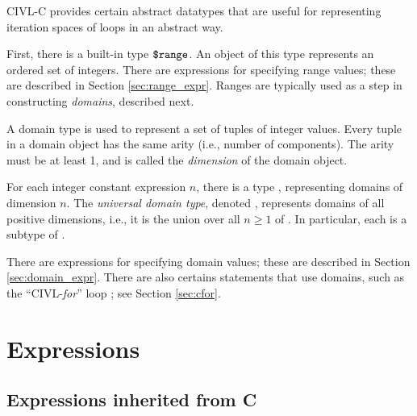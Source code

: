 CIVL-C provides certain abstract datatypes that are useful for
representing iteration spaces of loops in an abstract way.

First, there is a built-in type $\mbox{\texttt{\${}range}}$.  An object of this type
represents an ordered set of integers.  There are expressions for
specifying range values; these are described in Section
\ref{sec:range_expr}.   Ranges are typically used as a step
in constructing \emph{domains}, described next.

A domain type is used to represent a set of tuples of integer values.
Every tuple in a domain object has the same arity (i.e., number of
components).  The arity must be at least 1, and is called the
\emph{dimension} of the domain object.

For each integer constant expression $n$, there is a type
, representing domains of dimension $n$.
The \emph{universal domain type}, denoted \cdomain{}, represents
domains of all positive dimensions, i.e., it is the union over all
$n\geq 1$ of .  In particular, each 
is a subtype of \cdomain{}.

There are expressions for specifying domain values; these are
described in Section \ref{sec:domain_expr}.  There are also certains
statements that use domains, such as the ``CIVL-\emph{for}'' loop
\cfor; see Section \ref{sec:cfor}.


\section{Expressions}

\subsection{Expressions inherited from C}

